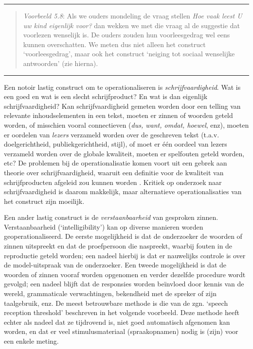 \documentclass[
]{book}
\begin{document}
\begin{center}\rule{0.5\linewidth}{0.5pt}\end{center}

\begin{quote}
\emph{Voorbeeld 5.8}:
Als we ouders mondeling de vraag stellen \emph{Hoe vaak leest U uw kind
eigenlijk voor?} dan wekken we met die vraag al de suggestie dat
voorlezen wenselijk is. De ouders zouden hun voorleesgedrag wel eens
kunnen overschatten. We meten dus niet alleen het construct
`voorleesgedrag', maar ook het construct `neiging tot sociaal wenselijke
antwoorden' (zie hierna).
\end{quote}

\begin{center}\rule{0.5\linewidth}{0.5pt}\end{center}

Een notoir lastig construct om te operationaliseren is
\emph{schrijfvaardigheid}. Wat is een goed en wat is een slecht
schrijfproduct? En wat is dan eigenlijk schrijfvaardigheid? Kan
schrijfvaardigheid gemeten worden door een telling van relevante
inhoudselementen in een tekst, moeten er zinnen of woorden geteld
worden, of misschien vooral connectieven (\emph{dus, want, omdat, hoewel},
enz), moeten er oordelen van \emph{lezers} verzameld worden over de
geschreven tekst (t.a.v. doelgerichtheid, publiekgerichtheid, stijl), of
moet er één oordeel van lezers verzameld worden over de globale
kwaliteit, moeten er spelfouten geteld worden, etc? De problemen bij de
operationalisatie komen voort uit een gebrek aan theorie over
schrijfvaardigheid, waaruit een definitie voor de kwaliteit van
schrijfproducten afgeleid zou kunnen worden \citep{BM93}. Kritiek op
onderzoek naar schrijfvaardigheid is daarom makkelijk, maar alternatieve
operationalisaties van het construct zijn moeilijk.

Een ander lastig construct is de \emph{verstaanbaarheid} van gesproken
zinnen. Verstaanbaarheid (`intelligibility') kan op diverse manieren
worden geoperationaliseerd. De eerste mogelijkheid is dat de onderzoeker
de woorden of zinnen uitspreekt en dat de proefpersoon die naspreekt,
waarbij fouten in de reproductie geteld worden; een nadeel hierbij is
dat er nauwelijks controle is over de model-uitspraak van de
onderzoeker. Een tweede mogelijkheid is dat de woorden of zinnen vooraf
worden opgenomen en verder dezelfde procedure wordt gevolgd; een nadeel
blijft dat de responsies worden beïnvloed door kennis van de wereld,
grammaticale verwachtingen, bekendheid met de spreker of zijn
taalgebruik, enz. De meest betrouwbare methode is die van de zgn.
`speech reception threshold' \citep{Plomp79} beschreven in het volgende
voorbeeld. Deze methode heeft echter als nadeel dat ze
tijdrovend is, niet goed automatisch afgenomen kan worden, en dat er
veel stimulusmateriaal (spraakopnamen) nodig is (zijn) voor een enkele
meting.
\end{document}
